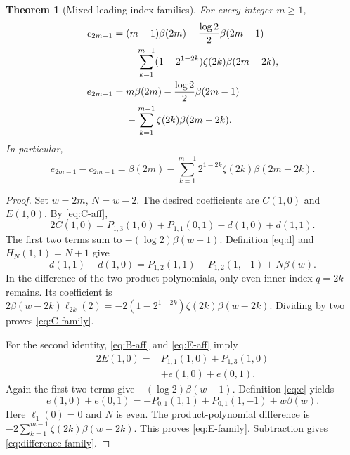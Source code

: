 \documentclass[11pt,a4paper]{article}
\numberwithin{equation}{section}
\newtheorem{theorem}{Theorem}[section]
\theoremstyle{definition}\newtheorem{definition}[theorem]{Definition}
\theoremstyle{remark}\newtheorem{remark}[theorem]{Remark}
\begin{document}
\begin{theorem}[Mixed leading-index families]\label{thm:families}
For every integer $m\ge1$,
\begin{align}
c_{2m-1}={}&(m-1)\beta(2m)-\frac{\log2}{2}\beta(2m-1)\notag\\
&-\sum_{k=1}^{m-1}(1-2^{1-2k})\zeta(2k)\beta(2m-2k),
\label{eq:C-family}\\
e_{2m-1}={}&m\beta(2m)-\frac{\log2}{2}\beta(2m-1)\notag\\
&-\sum_{k=1}^{m-1}\zeta(2k)\beta(2m-2k).
\label{eq:E-family}
\end{align}
In particular,
\begin{equation}
e_{2m-1}-c_{2m-1}
=\beta(2m)-\sum_{k=1}^{m-1}2^{1-2k}\zeta(2k)\beta(2m-2k).
\label{eq:difference-family}
\end{equation}
\end{theorem}
\begin{proof}
Set $w=2m$, $N=w-2$. The desired coefficients are $C(1,0)$ and $E(1,0)$.
By \eqref{eq:C-aff},
\[
2C(1,0)=P_{1,3}(1,0)+P_{1,1}(0,1)-d(1,0)+d(1,1).
\]
The first two terms sum to $-(\log2)\beta(w-1)$. Definition \eqref{eq:d}
and $H_N(1,1)=N+1$ give
\[
d(1,1)-d(1,0)=P_{1,2}(1,1)-P_{1,2}(1,-1)+N\beta(w).
\]
In the difference of the two product polynomials, only even inner index
$q=2k$ remains. Its coefficient is
$2\beta(w-2k)\ell_{2k}(2)
=-2(1-2^{1-2k})\zeta(2k)\beta(w-2k)$.
Dividing by two proves \eqref{eq:C-family}.

For the second identity, \eqref{eq:B-aff} and \eqref{eq:E-aff} imply
\begin{align*}
2E(1,0)={}&P_{1,1}(1,0)+P_{1,3}(1,0)\\
&+e(1,0)+e(0,1).
\end{align*}
Again the first two terms give $-(\log2)\beta(w-1)$. Definition \eqref{eq:e}
yields
\[
e(1,0)+e(0,1)
=-P_{0,1}(1,1)+P_{0,1}(1,-1)+w\beta(w).
\]
Here $\ell_1(0)=0$ and $N$ is even. The product-polynomial difference is
$-2\sum_{k=1}^{m-1}\zeta(2k)\beta(w-2k)$. This proves
\eqref{eq:E-family}. Subtraction gives \eqref{eq:difference-family}.
\end{proof}
\end{document}
